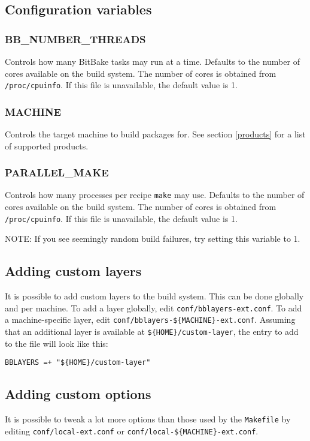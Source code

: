 \documentclass[a4paper]{article}
\newcommand{\shell}[1]{\texttt{\small #1}}
\begin{document}
  \subsection{Configuration variables}
    \subsubsection{BB\_NUMBER\_THREADS}
      Controls how many BitBake tasks may run at a time. Defaults to the
      number of cores available on the build system. The number of cores is
      obtained from \shell{/proc/cpuinfo}. If this file is unavailable, the
      default value is 1.

    \subsubsection{MACHINE}
      Controls the target machine to build packages for. See section \ref{products}
      for a list of supported products.

    \subsubsection{PARALLEL\_MAKE}
      Controls how many processes per recipe \shell{make} may use. Defaults to
      the number of cores available on the build system. The number of cores is
      obtained from \shell{/proc/cpuinfo}. If this file is unavailable, the
      default value is 1.

      NOTE: If you see seemingly random build failures, try setting this variable to 1.

  \subsection{Adding custom layers}
  \label{custom_layers}
     It is possible to add custom layers to the build system. This can be done globally
     and per machine. To add a layer globally, edit \shell{conf/bblayers-ext.conf}. To
     add a machine-specific layer, edit \shell{conf/bblayers-\$\{MACHINE\}-ext.conf}.
     Assuming that an additional layer is available at \shell{\$\{HOME\}/custom-layer},
     the entry to add to the file will look like this:

     \shell{BBLAYERS =+ "\$\{HOME\}/custom-layer"}

  \subsection{Adding custom options}
     It is possible to tweak a lot more options than those used by the
     \shell{Makefile} by editing \shell{conf/local-ext.conf} or \shell{conf/local-\$\{MACHINE\}-ext.conf}.
\end{document}
